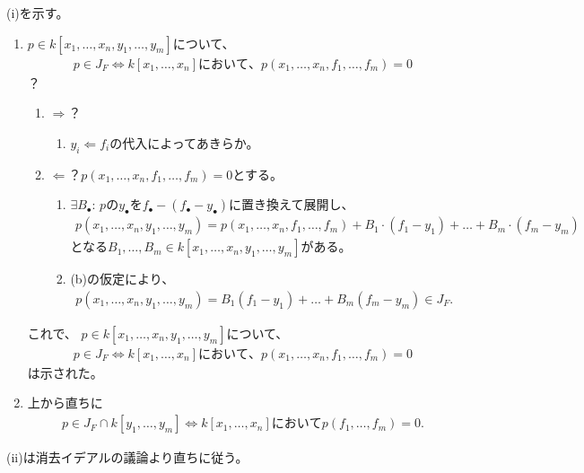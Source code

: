 \begin{myproof}
  (i)を示す。
  \begin{enumerate}
    \item
    $p\in k[x_1,\dots,x_n,y_1,\dots,y_m]$について、
    \begin{align}
      p\in J_F \iff
      k[x_1,\dots,x_n] において、 p(x_1,\dots,x_n,f_1,\dots,f_m) = 0
    \end{align}？
    \begin{enumerate}
      \item $\Rightarrow$？
      \begin{enumerate}
        \item $y_i \Leftarrow f_i$の代入によってあきらか。
      \end{enumerate}
      \item $\Leftarrow$？$p(x_1,\dots,x_n,f_1,\dots,f_m) = 0$とする。
      \begin{enumerate}
        \item  $\exists B_\bullet$:
        $p$の$y_\bullet$を$f_\bullet -(f_\bullet - y_\bullet)$に置き換えて展開し、
        \begin{align}
          p(x_1,\dots,x_n,y_1,\dots,y_m)
          =
          p(x_1,\dots,x_n,f_1,\dots,f_m) + B_1\cdot (f_1-y_1) + \dots + B_m\cdot (f_m-y_m)
        \end{align}
        となる$B_1,\dots,B_m \in k[x_1,\dots,x_n,y_1,\dots,y_m]$がある。
        \item
        (b)の仮定により、
        \begin{align}
          p(x_1,\dots,x_n,y_1,\dots,y_m) = B_1(f_1-y_1) + \dots + B_m(f_m-y_m)\in J_F.
        \end{align}
      \end{enumerate}
    \end{enumerate}
    これで、
        $p\in k[x_1,\dots,x_n,y_1,\dots,y_m]$について、
    \begin{align}
      p\in J_F \iff
      k[x_1,\dots,x_n] において、 p(x_1,\dots,x_n,f_1,\dots,f_m) = 0
    \end{align}は示された。
    \item
    上から直ちに
    \begin{align}
      p\in J_F\cap k[y_1,\dots,y_m]
      \iff
      k[x_1,\dots,x_n] において p(f_1,\dots,f_m) = 0.
    \end{align}
  \end{enumerate}
  (ii)は消去イデアルの議論より直ちに従う。
\end{myproof}

